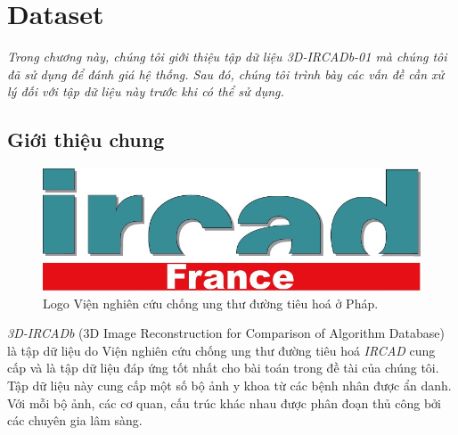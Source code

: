 \chapter{Dataset}
\label{chap:tap_du_lieu}
	\textit{Trong chương này, chúng tôi giới thiệu tập dữ liệu 3D-IRCADb-01 mà chúng tôi đã sử dụng để đánh giá hệ thống. Sau đó, chúng tôi trình bày các vấn đề cần xử lý đối với tập dữ liệu này trước khi có thể sử dụng.}
\minitoc

\section{Giới thiệu chung}
\label{sec:gioi_thieu_chung}
	\begin{figure}[h!]
		\centering
		\includegraphics[width=.4\textwidth]{figures/ircad_logo}
		\caption{Logo Viện nghiên cứu chống ung thư đường tiêu hoá ở Pháp.}
		\label{fig:3d_ircadb_01_visualize}
	\end{figure}
	\textit{3D-IRCADb} (3D Image Reconstruction for Comparison of Algorithm Database) là tập dữ liệu do Viện nghiên cứu chống ung thư đường tiêu hoá \textit{IRCAD} cung cấp và là tập dữ liệu đáp ứng tốt nhất cho bài toán trong đề tài của chúng tôi. Tập dữ liệu này cung cấp một số bộ ảnh y khoa từ các bệnh nhân được ẩn danh. Với mỗi bộ ảnh, các cơ quan, cấu trúc khác nhau được phân đoạn thủ công bởi các chuyên gia lâm sàng.
	
